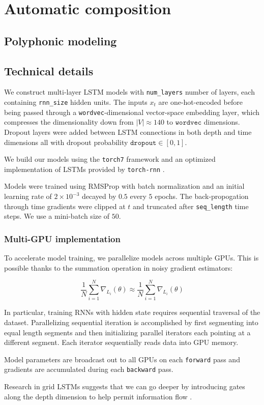 \chapter{Automatic composition}

\section{Polyphonic modeling}

\section{Technical details}

We construct multi-layer LSTM models with \texttt{num\_layers} number of
layers, each containing \texttt{rnn\_size} hidden units. The inputs $x_t$ are
one-hot-encoded before being passed through a \texttt{wordvec}-dimensional
vector-space embedding layer, which compresses the dimensionality down from
$|V| \approx 140$ to $\texttt{wordvec}$ dimensions. Dropout layers were added
between LSTM connections in both depth and time dimensions all with dropout
probability $\texttt{dropout} \in [0,1]$.

We build our models using the \texttt{torch7} framework and
an optimized implementation of LSTMs provided by \texttt{torch-rnn} .

Models were trained using RMSProp  with batch normalization 
and an initial learning rate of $2 \times 10^{-3}$ decayed by $0.5$ every $5$
epochs. The back-propogation through time gradients were clipped
at $t$  and truncated after \texttt{seq\_length} time steps.
We use a mini-batch size of $50$.

\subsection{Multi-GPU implementation}

To accelerate model training, we parallelize models across multiple GPUs. This is possible
thanks to the summation operation in noisy gradient estimators:

\begin{equation}
  \frac{1}{N} \sum_{i=1}^N \nabla_L_i(\theta) \approx \frac{1}{N} \sum_{i=1}^N \nabla_L_i(\theta)
\end{equation}

In particular, training RNNs with hidden state requires sequential traversal
of the dataset. Parallelizing sequential iteration is accomplished by first segmenting
into equal length segments and then initializing parallel iterators each
pointing at a different segment. Each iterator sequentially reads data
into GPU memory.

Model parameters are broadcast out to all GPUs on each \texttt{forward} pass
and gradients are accumulated during each \texttt{backward} pass.

Research in grid LSTMs suggests that we can go deeper by introducing
gates along the depth dimension to help permit information flow .
